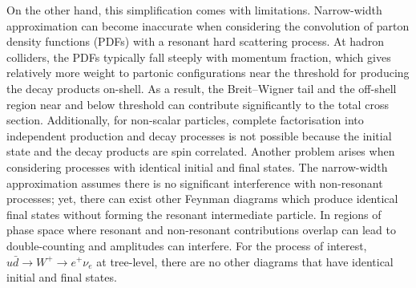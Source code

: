 \documentclass[a4paper,11pt]{article}
\begin{document}
 On the other hand, this simplification comes with limitations. Narrow-width approximation can become inaccurate when considering the convolution of parton density functions (PDFs) with a resonant hard scattering process\cite{Uhlemann:2008pm}. At hadron colliders, the PDFs typically fall steeply with momentum fraction, which gives relatively more weight to partonic configurations near the threshold for producing the decay products on-shell\cite{Kauer:2007zc}. As a result, the Breit–Wigner tail and the off-shell region near and below threshold can contribute significantly to the total cross section. Additionally, for non-scalar particles, complete factorisation into independent production and decay processes is not possible because the initial state and the decay products are spin correlated\cite{Uhlemann:2008pm}. Another problem arises when considering processes with identical initial and final states. The narrow-width approximation assumes there is no significant interference with non-resonant processes\cite{Berdine:2007uv}; yet, there can exist other Feynman diagrams which produce identical final states without forming the resonant intermediate particle. In regions of phase space where resonant and non-resonant contributions overlap can lead to double-counting and amplitudes can interfere\cite{Kauer:2001sp}. For the process of interest, $u \bar{d} \rightarrow W^+ \rightarrow e^+ \nu_e$ at tree-level, there are no other diagrams that have identical initial and final states.\\ 
 
\end{document}
